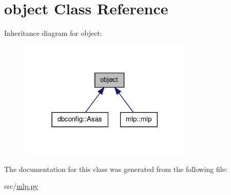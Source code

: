 \hypertarget{classobject}{
\section{object Class Reference}
\label{classobject}
}


Inheritance diagram for object:
\nopagebreak
\begin{figure}[H]
\begin{center}
\leavevmode
\includegraphics[width=234pt]{classobject__inherit__graph}
\end{center}
\end{figure}


The documentation for this class was generated from the following file:\begin{DoxyCompactItemize}
\item 
src/\hyperlink{mlp_8py}{mlp.py}\end{DoxyCompactItemize}
